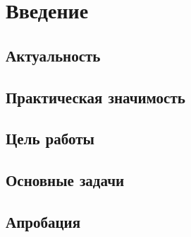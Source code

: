 \chapter{Введение}
\section{Актуальность}
\section{Практическая значимость}
\section{Цель работы}
\section{Основные задачи}
\section{Апробация}